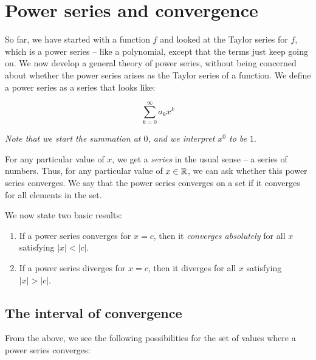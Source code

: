 \documentclass{amsart}
\begin{document}
\section{Power series and convergence}

So far, we have started with a function $f$ and looked at the Taylor
series for $f$, which is a power series -- like a polynomial, except
that the terms just keep going on. We now develop a general theory of
power series, without being concerned about whether the power series
arises as the Taylor series of a function. We define a power series as
a series that looks like:

$$\sum_{k=0}^\infty a_kx^k$$

{\em Note that we start the summation at $0$, and we interpret $x^0$
to be $1$}.

For any particular value of $x$, we get a {\em series} in the usual
sense -- a series of numbers. Thus, for any particular value of $x \in
\mathbb{R}$, we can ask whether this power series converges. We say that the
power series converges on a set if it converges for all elements in
the set.

We now state two basic results:

\begin{enumerate}
\item If a power series converges for $x = c$, then it {\em converges
  absolutely} for all $x$ satisfying $|x| < |c|$.
\item If a power series diverges for $x = c$, then it diverges for all
  $x$ satisfying $|x| > |c|$.
\end{enumerate}

\subsection{The interval of convergence}

From the above, we see the following possibilities for the set of
values where a power series converges:
\end{document}
